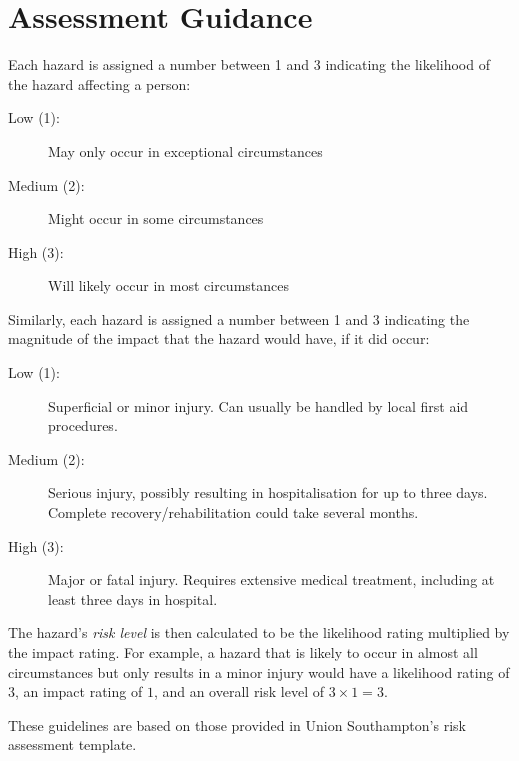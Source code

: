 \documentclass[a4paper,landscape]{article}
\begin{document}
\section*{Assessment Guidance}

Each hazard is assigned a number between 1 and 3 indicating the likelihood of
the hazard affecting a person:
\begin{description}
    \item[Low (1):] May only occur in exceptional circumstances
    \item[Medium (2):] Might occur in some circumstances
    \item[High (3):] Will likely occur in most circumstances
\end{description}

Similarly, each hazard is assigned a number between 1 and 3 indicating the
magnitude of the impact that the hazard would have, if it did occur:
\begin{description}
    \item[Low (1):] Superficial or minor injury. Can usually be handled by local
    first aid procedures.
    \item[Medium (2):] Serious injury, possibly resulting in hospitalisation for
    up to three days. Complete recovery/rehabilitation could take several months.
    \item[High (3):] Major or fatal injury. Requires extensive medical treatment,
    including at least three days in hospital.
\end{description}

The hazard's \emph{risk level} is then calculated to be the likelihood rating
multiplied by the impact rating. For example, a hazard that is likely to occur
in almost all circumstances but only results in a minor injury would have a
likelihood rating of $3$, an impact rating of $1$, and an overall risk level of
$3 \times 1 = 3$.

These guidelines are based on those provided in Union Southampton's risk
assessment template.
\end{document}

